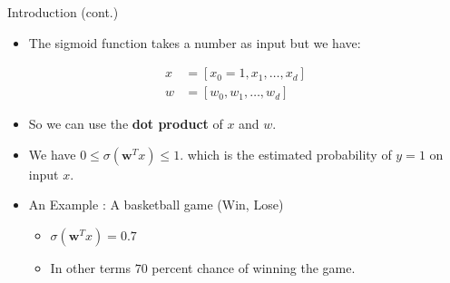 \documentclass[serif, aspectratio=169]{beamer}
\begin{document}
    
\begin{frame}{Introduction (cont.)}
    \begin{itemize}
      \item The sigmoid function takes a number as input but we have:
    \end{itemize}
        \begin{align*}
            x &= [x_0=1,x_1, \dots, x_d] \\
            w &= [w_0, w_1, \dots, w_d]
        \end{align*}
    \begin{itemize} 
      \item So we can use the \textbf{dot product} of $x$ and $w$.
      
      \item We have $0\leq \sigma (\mathbf{w}^Tx) \leq 1$. which is the estimated probability of $y=1$ on input $x$.

      \item An Example : A basketball game (Win, Lose)
        \begin{itemize}
            \item $\sigma (\mathbf{w}^T x) = 0.7$
            \item In other terms $70$ percent chance of winning the game.
        \end{itemize}
        
    \end{itemize}
\end{frame}
\end{document}
